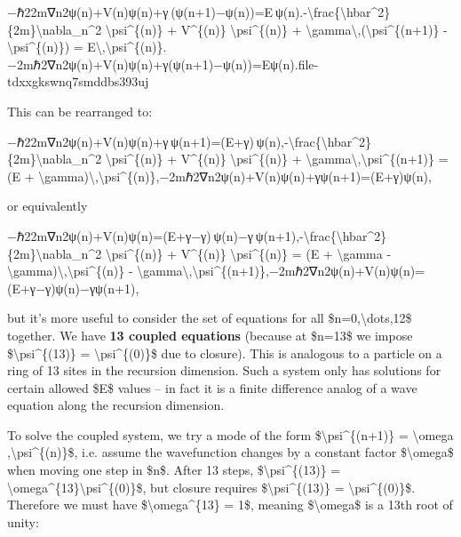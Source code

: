 \documentclass[
]{article}
\begin{document}
−ℏ22m∇n2ψ(n)+V(n)ψ(n)+γ (ψ(n+1)−ψ(n))=E ψ(n).-\textbackslash frac\{\textbackslash hbar\^{}2\}\{2m\}\textbackslash nabla\_n\^{}2
\textbackslash psi\^{}\{(n)\} + V\^{}\{(n)\}
\textbackslash psi\^{}\{(n)\} +
\textbackslash gamma\textbackslash,(\textbackslash psi\^{}\{(n+1)\} -
\textbackslash psi\^{}\{(n)\}) =
E\textbackslash,\textbackslash psi\^{}\{(n)\}.−2mℏ2\hspace{0pt}∇n2\hspace{0pt}ψ(n)+V(n)ψ(n)+γ(ψ(n+1)−ψ(n))=Eψ(n).\hspace{0pt}file-tdxxgkswnq7smddbs393uj\hspace{0pt}

This can be rearranged to:

−ℏ22m∇n2ψ(n)+V(n)ψ(n)+γ ψ(n+1)=(E+γ) ψ(n),-\textbackslash frac\{\textbackslash hbar\^{}2\}\{2m\}\textbackslash nabla\_n\^{}2
\textbackslash psi\^{}\{(n)\} + V\^{}\{(n)\}
\textbackslash psi\^{}\{(n)\} +
\textbackslash gamma\textbackslash,\textbackslash psi\^{}\{(n+1)\} = (E
+
\textbackslash gamma)\textbackslash,\textbackslash psi\^{}\{(n)\},−2mℏ2\hspace{0pt}∇n2\hspace{0pt}ψ(n)+V(n)ψ(n)+γψ(n+1)=(E+γ)ψ(n),

or equivalently

−ℏ22m∇n2ψ(n)+V(n)ψ(n)=(E+γ−γ) ψ(n)−γ ψ(n+1),-\textbackslash frac\{\textbackslash hbar\^{}2\}\{2m\}\textbackslash nabla\_n\^{}2
\textbackslash psi\^{}\{(n)\} + V\^{}\{(n)\}
\textbackslash psi\^{}\{(n)\} = (E + \textbackslash gamma -
\textbackslash gamma)\textbackslash,\textbackslash psi\^{}\{(n)\} -
\textbackslash gamma\textbackslash,\textbackslash psi\^{}\{(n+1)\},−2mℏ2\hspace{0pt}∇n2\hspace{0pt}ψ(n)+V(n)ψ(n)=(E+γ−γ)ψ(n)−γψ(n+1),

but it's more useful to consider the set of equations for all
\$n=0,\textbackslash dots,12\$ together. We have \textbf{13 coupled
equations} (because at \$n=13\$ we impose
\$\textbackslash psi\^{}\{(13)\} = \textbackslash psi\^{}\{(0)\}\$ due
to closure)\hspace{0pt}. This is analogous to a particle on a ring of 13
sites in the recursion dimension. Such a system only has solutions for
certain allowed \$E\$ values -- in fact it is a finite difference analog
of a wave equation along the recursion dimension.

To solve the coupled system, we try a mode of the form
\$\textbackslash psi\^{}\{(n+1)\} = \textbackslash omega
,\textbackslash psi\^{}\{(n)\}\$, i.e. assume the wavefunction changes
by a constant factor \$\textbackslash omega\$ when moving one step in
\$n\$\hspace{0pt}. After 13 steps, \$\textbackslash psi\^{}\{(13)\} =
\textbackslash omega\^{}\{13\}\textbackslash psi\^{}\{(0)\}\$, but
closure requires \$\textbackslash psi\^{}\{(13)\} =
\textbackslash psi\^{}\{(0)\}\$. Therefore we must have
\$\textbackslash omega\^{}\{13\} = 1\$, meaning \$\textbackslash omega\$
is a 13th root of unity:
\end{document}
